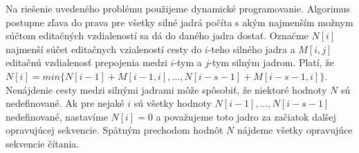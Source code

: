 Na riešenie uvedeného problému použijeme dynamické programovanie. Algorimus postupne zľava do prava pre všetky silné jadrá počíta s akým najmenším možnym súčtom editačných vzdialeností sa dá do daného jadra dostať. Označme $N[i]$ najmenší súčet editačnych vzialeností cesty do $i$-teho silného jadra a $M[i, j]$ editačnú vzdialenosť prepojenia medzi $i$-tym  a $j$-tym silným jadrom. Platí, že $N[i] = min \{N[i - 1] + M[i - 1, i], ..., N[i - s - 1] + M[i - s - 1, i]\}$. Nenájdenie cesty medzi silnými jadrami môže spôsobiť, že niektoré hodnoty $N$ sú nedefinované. Ak pre nejaké $i$ sú všetky hodnoty $N[i - 1], ..., N[i - s - 1]$ nedefinované, nastavíme $N[i] = 0$ a považujeme toto jadro za začiatok dalšej opravujúcej sekvencie. Spätným prechodom hodnôt $N$ nájdeme všetky opravujúce sekvencie čítania.